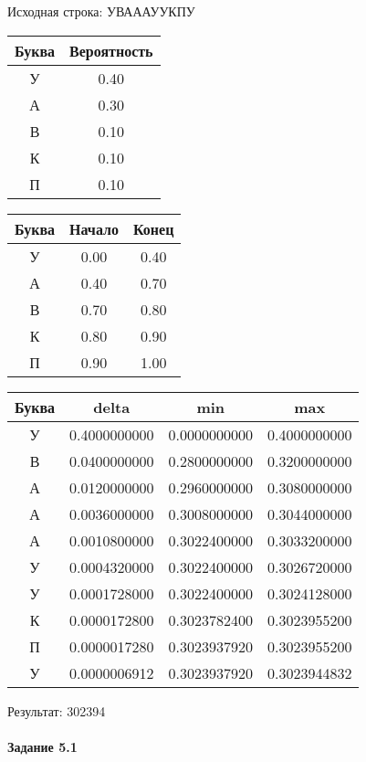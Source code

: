 \documentclass[a4paper, 12pt]{article}
\begin{document}
Исходная строка: УВАААУУКПУ\
\begin{center}
 \begin{tabular}{ |c|c| } 
  \hline
     Буква & Вероятность \\ \hline
У & 0.40\\\hline
А & 0.30\\\hline
В & 0.10\\\hline
К & 0.10\\\hline
П & 0.10
\\ \hline \end{tabular}
\end{center}
\begin{center}
 \begin{tabular}{ |c|c|c| } 
  \hline
     Буква & Начало & Конец \\ \hline
У & 0.00 & 0.40\\\hline
А & 0.40 & 0.70\\\hline
В & 0.70 & 0.80\\\hline
К & 0.80 & 0.90\\\hline
П & 0.90 & 1.00
\\ \hline \end{tabular}
\end{center}
\begin{center}
 \begin{tabular}{ |c|c|c|c| } 
  \hline
     Буква & delta & min & max \\ \hline
У & 0.4000000000 & 0.0000000000 & 0.4000000000\\\hline
В & 0.0400000000 & 0.2800000000 & 0.3200000000\\\hline
А & 0.0120000000 & 0.2960000000 & 0.3080000000\\\hline
А & 0.0036000000 & 0.3008000000 & 0.3044000000\\\hline
А & 0.0010800000 & 0.3022400000 & 0.3033200000\\\hline
У & 0.0004320000 & 0.3022400000 & 0.3026720000\\\hline
У & 0.0001728000 & 0.3022400000 & 0.3024128000\\\hline
К & 0.0000172800 & 0.3023782400 & 0.3023955200\\\hline
П & 0.0000017280 & 0.3023937920 & 0.3023955200\\\hline
У & 0.0000006912 & 0.3023937920 & 0.3023944832
\\ \hline \end{tabular}
\end{center}
Результат: 302394
\pagebreak
\paragraph{Задание 5.1}
\end{document}
